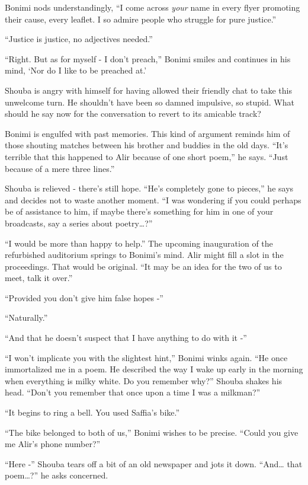 \documentclass[twoside,11pt]{book}
\begin{document}
Bonimi nods understandingly, ``I come across \textit{your} name in every flyer promoting their cause, every
leaflet. I so admire people who struggle for pure justice.''

``Justice is justice, no adjectives needed.''

``Right. But as for myself - I don't preach,'' Bonimi smiles and continues in his mind,
`Nor do I like to be preached at.'

Shouba is angry with himself for having allowed their friendly chat to take this unwelcome turn. He shouldn't have been
so damned impulsive, so stupid. What should he say now for the conversation to revert to its amicable track?

Bonimi is engulfed with past memories. This kind of argument reminds him of those shouting matches between his brother
and buddies in the old days. ``It's terrible that this happened to Alir because of one short poem,'' he says. ``Just
because of a mere three lines.''

Shouba is relieved - there's still hope. ``He's completely gone to pieces,'' he says and
decides not to waste another moment. ``I was wondering if you could perhaps be of assistance to him, if
maybe there's something for him in one of your broadcasts, say a series about poetry{\dots}?''

``I would be more than happy to help.'' The upcoming inauguration of the refurbished
auditorium springs to Bonimi's mind. Alir might fill a slot in the proceedings. That would be original.
``It may be an idea for the two of us to meet, talk it over.''

``Provided you don't give him false hopes -''

``Naturally.''

``And that he doesn't suspect that I have anything to do with it -''

``I won't implicate you with the slightest hint,'' Bonimi winks again. ``He once
immortalized me in a poem. He described the way I wake up early in the morning when everything is milky white. Do you
remember why?'' Shouba shakes his head. ``Don't you remember that once upon a time I was a
milkman?''

``It begins to ring a bell. You used Saffia's bike.''

``The bike belonged to both of us,'' Bonimi wishes to be precise. ``Could you
give me Alir's phone number?''

``Here -'' Shouba tears off a bit of an old newspaper and jots it down.
``And{\dots} that poem{\dots}?'' he asks concerned.
\end{document}
